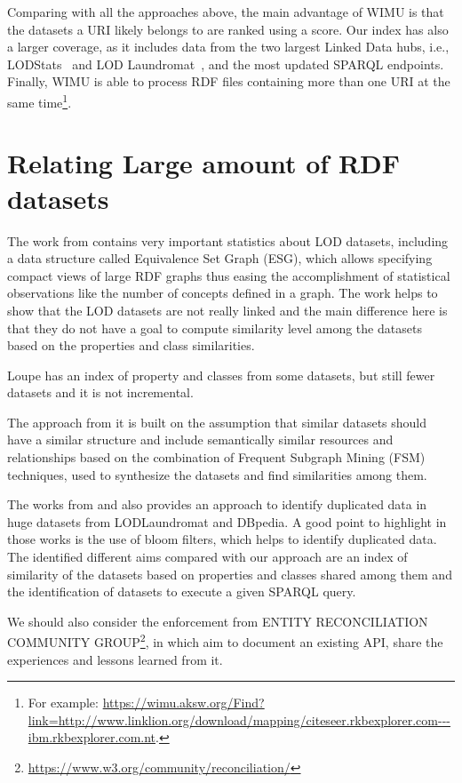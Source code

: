 Comparing with all the approaches above, the main advantage of WIMU is that the datasets a URI likely belongs to are ranked using a score.
Our index has also a larger coverage, as it includes data from the two largest Linked Data hubs, i.e., LODStats~\cite{auer2012lodstats} and LOD Laundromat~\cite{beek2014lod}, and the most updated SPARQL endpoints.
Finally, WIMU is able to process RDF files containing more than one URI at the same time\footnote{For example: \url{https://wimu.aksw.org/Find?link=http://www.linklion.org/download/mapping/citeseer.rkbexplorer.com---ibm.rkbexplorer.com.nt}.}.

\section{Relating Large amount of RDF datasets}
The work from \cite{asprino2019linked,asprino2019observing,asprino2019triplifying} contains very important statistics about LOD datasets, including a data structure called Equivalence Set Graph (ESG), which allows specifying compact views of large RDF graphs thus easing the accomplishment of statistical observations like the number of concepts defined in a graph. The work helps to show that the LOD datasets are not really linked and the main difference here is that they do not have a goal to compute similarity level among the datasets based on the properties and class similarities.

Loupe \cite{mihindukulasooriya2016two} has an index of property and classes from some datasets, but still fewer datasets and it is not incremental.

The approach from \cite{emaldi2015detection} it is built on the assumption that similar datasets should have a similar structure and include semantically similar resources and relationships based on the combination of Frequent Subgraph Mining (FSM) techniques, used to synthesize the datasets and find similarities among them.

The works from \cite{baron-2016-ldow-assessing-links} and \cite{BaronKKPEH2017IDOL} also provides an approach to identify duplicated data in huge datasets from LODLaundromat and DBpedia. A good point to highlight in those works is the use of bloom filters, which helps to identify duplicated data. The identified different aims compared with our approach are an index of similarity of the datasets based on properties and classes shared among them and the identification of datasets to execute a given SPARQL query. 

We should also consider the enforcement from ENTITY RECONCILIATION COMMUNITY GROUP\footnote{\url{https://www.w3.org/community/reconciliation/}}, in which aim to document an existing API, share the experiences and lessons learned from it\cite{DBLP:journals/corr/abs-1906-08092}.

